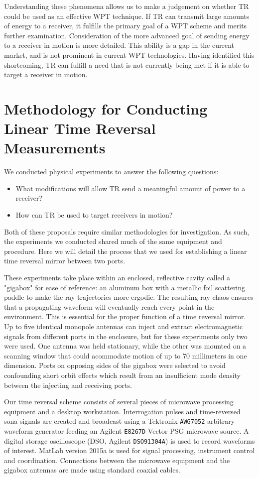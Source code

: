 Understanding these phenomena allows us to make a judgement on whether TR could be used as an effective WPT technique. If TR can transmit large amounts of energy to a receiver, it fulfills the primary goal of a WPT scheme and merits further examination. Consideration of the more advanced goal of sending energy to a receiver in motion is more detailed. This ability is a gap in the current market, and is not prominent in current WPT technologies. Having identified this shortcoming, TR can fulfill a need that is not currently being met if it is able to target a receiver in motion.

\section{Methodology for Conducting Linear Time Reversal Measurements}
\label{sec:ltr-meth}

We conducted physical experiments to answer the following questions:
\begin{itemize}
    \item What modifications will allow TR send a meaningful amount of power to a receiver?
    \item How can TR be used to target receivers in motion?
\end{itemize}
Both of these proposals require similar methodologies for investigation. As such, the experiments we conducted shared much of the same equipment and procedure. Here we will detail the process that we used for establishing a linear time reversal mirror between two ports.

These experiments take place within an enclosed, reflective cavity called a "gigabox" for ease of reference: an aluminum box with a metallic foil scattering paddle to make the ray trajectories more ergodic. The resulting ray chaos ensures that a propagating waveform will eventually reach every point in the environment. This is essential for the proper function of a time reversal mirror. Up to five identical monopole antennas can inject and extract electromagnetic signals from different ports in the enclosure, but for these experiments only two were used. One antenna was held stationary, while the other was mounted on a scanning window that could acommodate motion of up to 70 millimeters in one dimension. Ports on opposing sides of the gigabox were selected to avoid confounding short orbit effects which result from an insufficient mode density between the injecting and receiving ports.

Our time reversal scheme consists of several pieces of microwave processing equipment and a desktop workstation. Interrogation pulses and time-reversed sona signals are created and broadcast using a Tektronix \texttt{AWG7052} arbitrary waveform generator feeding an Agilent \texttt{E8267D} Vector PSG microwave source. A digital storage oscilloscope (DSO, Agilent \texttt{DSO91304A}) is used to record waveforms of interest. MatLab version 2015a is used for signal processing, instrument control and coordination. Connections between the microwave equipment and the gigabox antennas are made using standard coaxial cables.

